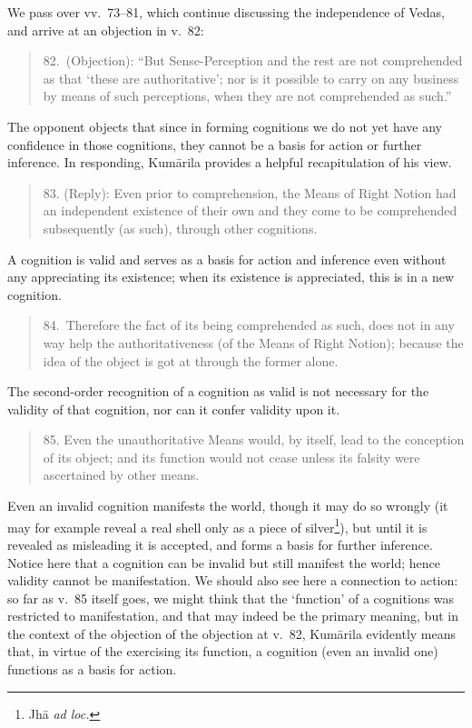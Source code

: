 ﻿\documentclass[11pt]{amsart}
\begin{document}
We pass over vv.~73--81, which continue discussing the independence of Vedas, and arrive at an objection in v.~82:\small\begin{quote}82.~(Objection): ``But Sense-Perception and the rest are not comprehended as that `these are authoritative'; nor is it possible to carry on any business by means of such perceptions, when they are not comprehended as such.''\end{quote}\normalsize The opponent objects that since in forming cognitions we do not yet have any confidence in those cognitions, they cannot be a basis for action or further inference. In responding, Kum\=arila provides a helpful recapitulation of his view.\small\begin{quote} 83. (Reply): Even prior to comprehension, the Means of Right Notion had an independent existence of their own and they come to be comprehended subsequently (as such), through other cognitions.\end{quote}\normalsize A cognition is valid and serves as a basis for action and inference even without any appreciating its existence; when its existence is appreciated, this is in a new cognition.\small\begin{quote} 84.~Therefore the fact of its being comprehended as such, does not in any way help the authoritativeness (of the Means of Right Notion); because the idea of the object is got at through the former alone.\end{quote}\normalsize The second-order recognition of a cognition as valid is not necessary for the validity of that cognition, nor can it confer validity upon it.\small\begin{quote}85. Even the unauthoritative Means would, by itself, lead to the conception of its object; and its function would not cease unless its falsity were ascertained by other means.\end{quote}\normalsize Even an invalid cognition manifests the world, though it may do so wrongly (it may for example reveal a real shell only as a piece of silver\footnote{Jh\=a \emph{ad loc.}}), but until it is revealed as misleading it is accepted, and forms a basis for further inference. Notice here that a cognition can be invalid but still manifest the world; hence validity cannot be manifestation. We should also see here a connection to action: so far as v.~85 itself goes, we might think that the `function' of a cognitions was restricted to manifestation, and that may indeed be the primary meaning, but in the context of the objection of the objection at v.~82, Kum\=arila evidently means that, in virtue of the exercising its function, a cognition (even an invalid one) functions as a basis for action.
\end{document}
